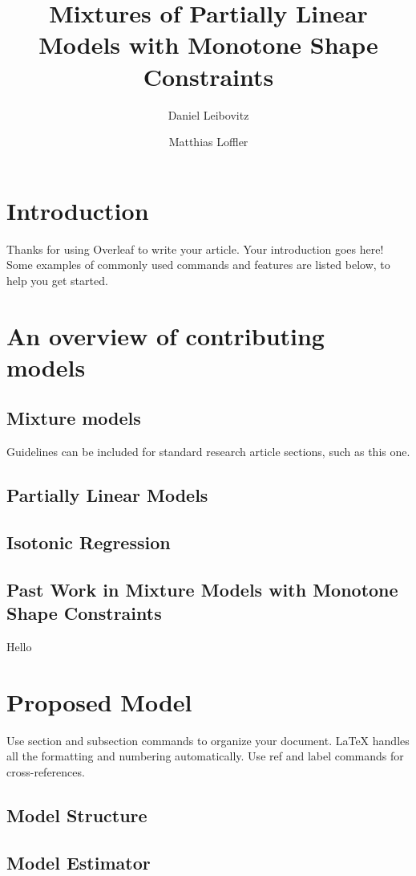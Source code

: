 \documentclass[fleqn,10pt]{olplainarticle}\usepackage[]{graphicx}\usepackage[]{color}
\title{Mixtures of Partially Linear Models with Monotone Shape Constraints}
\author[1]{Daniel Leibovitz}
\author[2]{Matthias Loffler}
\affil[1]{danleibovitz@gmail.com}
\affil[2]{Address of second author}
\begin{document}
\flushbottom
\maketitle
\thispagestyle{empty}

\section{Introduction}

Thanks for using Overleaf to write your article. Your introduction goes here! Some examples of commonly used commands and features are listed below, to help you get started.

\section{An overview of contributing models}
\subsection{Mixture models}

Guidelines can be included for standard research article sections, such as this one.
\subsection{Partially Linear Models}
\subsection{Isotonic Regression}
\subsection{Past Work in Mixture Models with Monotone Shape Constraints}
Hello


\section{Proposed Model}
\label{sec:examples}

Use section and subsection commands to organize your document. \LaTeX{} handles all the formatting and numbering automatically. Use ref and label commands for cross-references.


\subsection{Model Structure}


\subsection{Model Estimator}
\end{document}
